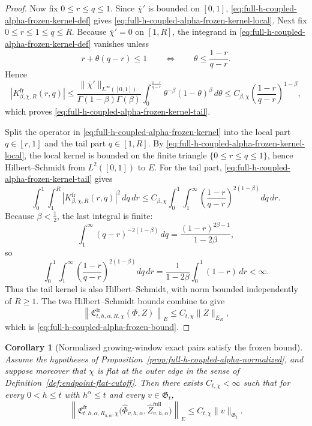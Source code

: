 \documentclass[11pt,a4paper]{amsart}
\theoremstyle{plain}
\newtheorem{corollary}[theorem]{Corollary}
\theoremstyle{definition}
\theoremstyle{remark}
\begin{document}
\begin{proof}
Now fix \(0\le r\le q\le1\). Since \(\overline\chi'\) is bounded on \([0,1]\),
\eqref{eq:full-h-coupled-alpha-frozen-kernel-def} gives
\eqref{eq:full-h-coupled-alpha-frozen-kernel-local}. Next fix \(0\le r\le1\le q\le R\). Because
\(\overline\chi'=0\) on \([1,R]\), the integrand in
\eqref{eq:full-h-coupled-alpha-frozen-kernel-def} vanishes unless
\[
r+\theta(q-r)\le 1
\qquad\Longleftrightarrow\qquad
\theta\le \frac{1-r}{q-r}.
\]
Hence
\[
\left|
K_{\beta,\chi,R}^{\mathrm{fr}}(r,q)
\right|
\le
\frac{\|\overline\chi'\|_{L^\infty([0,1])}}{\Gamma(1-\beta)\Gamma(\beta)}
\int_0^{\frac{1-r}{q-r}}
\theta^{-\beta}(1-\theta)^\beta\,d\theta
\le
C_{\beta,\chi}
\left(
\frac{1-r}{q-r}
\right)^{1-\beta},
\]
which proves \eqref{eq:full-h-coupled-alpha-frozen-kernel-tail}.

Split the operator in \eqref{eq:full-h-coupled-alpha-frozen-kernel} into the local part
\(q\in[r,1]\) and the tail part \(q\in[1,R]\). By
\eqref{eq:full-h-coupled-alpha-frozen-kernel-local}, the local kernel is bounded on the finite
triangle \(\{0\le r\le q\le1\}\), hence Hilbert--Schmidt from \(L^2([0,1])\) to \(E\). For the
tail part, \eqref{eq:full-h-coupled-alpha-frozen-kernel-tail} gives
\[
\int_0^1\int_1^R
\left|
K_{\beta,\chi,R}^{\mathrm{fr}}(r,q)
\right|^2\,dq\,dr
\le
C_{\beta,\chi}
\int_0^1\int_1^\infty
\left(
\frac{1-r}{q-r}
\right)^{2(1-\beta)}
dq\,dr.
\]
Because \(\beta<\tfrac12\), the last integral is finite:
\[
\int_1^\infty (q-r)^{-2(1-\beta)}\,dq
=
\frac{(1-r)^{2\beta-1}}{1-2\beta},
\]
so
\[
\int_0^1\int_1^\infty
\left(
\frac{1-r}{q-r}
\right)^{2(1-\beta)}
dq\,dr
=
\frac{1}{1-2\beta}\int_0^1 (1-r)\,dr
<
\infty.
\]
Thus the tail kernel is also Hilbert--Schmidt, with norm bounded independently of \(R\ge1\). The
two Hilbert--Schmidt bounds combine to give
\[
\left\|
\mathfrak C_{t,h,\alpha,R,\chi}^{\mathrm{fr}}(\Phi,Z)
\right\|_{E}
\le
C_{t,\chi}\|Z\|_{E_R},
\]
which is \eqref{eq:full-h-coupled-alpha-frozen-bound}.
\end{proof}

\begin{corollary}[Normalized growing-window exact pairs satisfy the frozen bound]
\label{cor:full-h-coupled-alpha-frozen-bound}
Assume the hypotheses of Proposition~\ref{prop:full-h-coupled-alpha-normalized}, and suppose
moreover that \(\chi\) is flat at the outer edge in the sense of
Definition~\ref{def:endpoint-flat-cutoff}. Then there exists \(C_{t,\chi}<\infty\) such that for
every \(0<h\le t\) with \(h^\alpha\le t\) and every \(v\in\mathfrak G_t\),
\begin{equation}\label{eq:full-h-coupled-alpha-frozen-bound-v}
\left\|
\mathfrak C_{t,h,\alpha,R_{h,\alpha},\chi}^{\mathrm{fr}}
\bigl(
\widehat\Phi_{v,h,\alpha},
\widehat Z_{v,h,\alpha}^{\mathrm{full}}
\bigr)
\right\|_{E}
\le
C_{t,\chi}\|v\|_{\mathfrak G_t}.
\end{equation}
\end{corollary}
\end{document}

